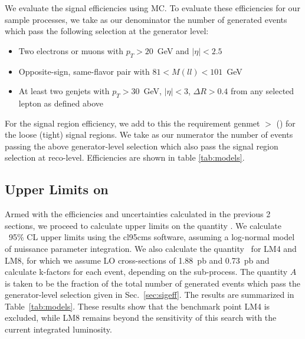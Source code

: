 We evaluate the signal efficiencies using MC. To evaluate these efficiencies for our 
sample processes, 
we take as our denominator the number of generated events which pass the following selection at
the generator level:

\begin{itemize}
\item Two electrons or muons with $p_T>20$~GeV and $|\eta|<2.5$
\item Opposite-sign, same-flavor pair with $81 < M(ll) < 101$~GeV
\item At least two genjets with $p_T > 30$~GeV, $|\eta|<3$, $\Delta R > 0.4$ from any selected lepton as defined above
\end{itemize}

For the %
signal region efficiency,
we add to this the requirement genmet
$>$ \signalmetl (\signalmett) for the loose (tight) signal regions.
We take as our numerator the number of events passing the above generator-level selection which
also pass the signal region selection at reco-level. 
Efficiencies are shown in table \ref{tab:models}.





\subsection{Upper Limits on \sta}

Armed with the efficiencies and uncertainties calculated in the previous 2 sections, we proceed
to calculate upper limits on the quantity \sta.
We calculate \statistics\ 95\% CL upper
limits using the cl95cms software, assuming a log-normal model of nuissance parameter integration.
We also calculate the quantity \sta ~for LM4 and LM8, for which we assume LO
cross-sections of 1.88~pb and 0.73~pb and calculate k-factors for each event, depending on the sub-process.
The quantity $A$ is taken to be the fraction of the total number of generated events which
pass the generator-level selection given in Sec.~\ref{sec:sigeff}. The results are summarized in
Table~\ref{tab:models}. 
These results show that the benchmark point LM4 is excluded, while
LM8 remains beyond the
sensitivity of this search with the current integrated luminosity.

